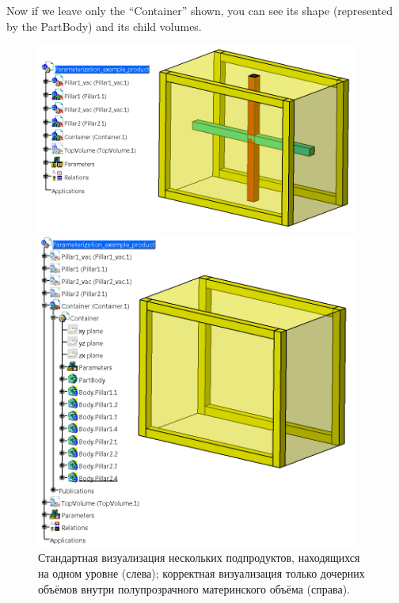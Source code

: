 Now if we leave only the ``Container'' shown, you can see its shape (represented by the PartBody) and its child volumes.

\begin{figure}[H]
\begin{minipage}[c]{0.495\textwidth}
\includegraphics[width=0.95\textwidth]{pictures/MultipleLevels1.png}
\end{minipage}
\hspace{0.01\textwidth}
\begin{minipage}[c]{0.495\textwidth}
\includegraphics[width=0.95\textwidth]{pictures/MultipleLevels2.png}
\end{minipage}
\caption{Стандартная визуализация нескольких подпродуктов, находящихся на одном уровне (слева); корректная визуализация только дочерних объёмов внутри полупрозрачного материнского объёма (справа).}
\label{fig:MultiLevel1}
\end{figure}


